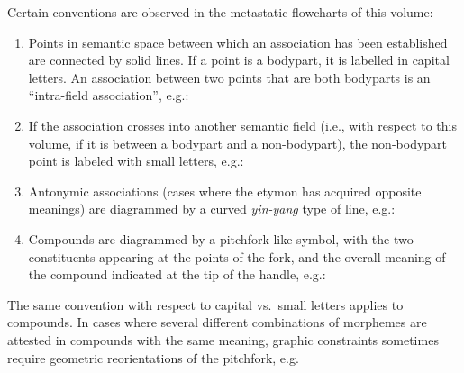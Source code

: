 Certain conventions are observed in the metastatic flowcharts of this volume:

\begin{enumerate}
\item Points in semantic space between which an association has been established
are connected by solid lines.  If a point is a bodypart, it is labelled in
capital letters.  An association between two points that are both bodyparts is
an “intra-field association”, e.g.:


\item If the association crosses into another semantic field (i.e., with respect
to this volume, if it is between a bodypart and a non-bodypart), the
non-bodypart point is labeled with small letters, e.g.:


\item Antonymic associations (cases where the etymon has acquired opposite
meanings) are diagrammed by a curved \textit{yin-yang} type of line, e.g.:


\item Compounds are diagrammed by a pitchfork-like symbol, with the two
constituents appearing at the points of the fork, and the overall meaning of the
compound indicated at the tip of the handle, e.g.:


\end{enumerate}

The same convention with respect to capital vs.\ small letters applies to
compounds. In cases where several different combinations of morphemes are attested in compounds with the same meaning, graphic constraints sometimes require geometric reorientations of the pitchfork, e.g.


